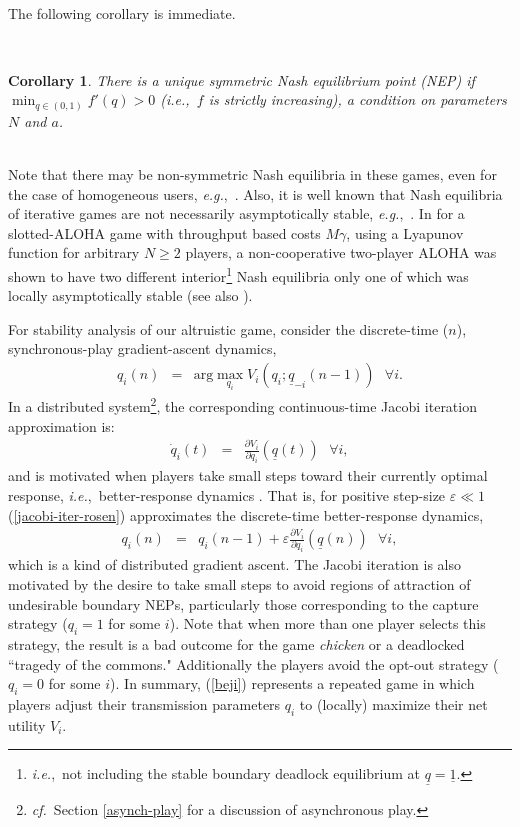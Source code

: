 \documentclass[12pt,onecolumn,draftcls]{IEEEtran}
\newtheorem{corollary}{Corollary}[section]
\newcommand{\ie}{{\em i.e.},~}
\newcommand{\eg}{{\em e.g.},~}
\newcommand{\cf}{{\em cf.}~}
\newcommand{\uq}{\underline{q}}
\newcommand{\uone}{\underline{1}}
\newcommand{\be}{\begin{eqnarray}}
\newcommand{\ee}{\end{eqnarray}}
\begin{document}
~\\
The following corollary is immediate.

~\\

\begin{corollary}
There is a unique symmetric Nash equilibrium point (NEP)
if 
$\min_{q\in(0,1)}f'(q) > 0$
(\ie $f$ is strictly increasing), a condition
on parameters $N$ and $a$.  
\end{corollary}



~\\
Note that there may be non-symmetric Nash equilibria in these games,
even for the case of homogeneous users, \eg \cite{JinKes12}.
Also, it is well known that
Nash equilibria of iterative games are not necessarily asymptotically
stable, \eg \cite{Seade80,Levine85,ZhangZhang96}.  In
\cite{Jin02a,Jin02b} for a slotted-ALOHA game with throughput based costs
$M\gamma$, using a Lyapunov function for arbitrary $N\geq 2$ players, a
non-cooperative two-player ALOHA was shown  to have two different
interior\footnote{\ie not including the stable boundary deadlock
equilibrium at $\uq=\uone$.} Nash equilibria only one of which was locally asymptotically
stable (see also \cite{Menache07}). 

For  stability analysis of our altruistic
game, consider the discrete-time ($n$), synchronous-play 
gradient-ascent dynamics,
\be\label{update-rule}
q_i(n) & = &    \mbox{arg}\max_{q_i} V_i(q_i; \uq_{-i}(n-1))
~~~\forall i.
\ee
In a distributed system\footnote{\cf Section \ref{asynch-play} for a
discussion of asynchronous play.},  the corresponding continuous-time
Jacobi iteration approximation is:
\be\label{jacobi-iter-rosen}
\dot{q}_i(t) & = & 
\frac{\partial V_i}{\partial q_i}(\uq(t)) 
~~~\forall i,
\ee
and is motivated when players take small steps toward their currently optimal
response, \ie better-response dynamics \cite{Shamma05}.
That is, for positive step-size $\varepsilon\ll 1$
(\ref{jacobi-iter-rosen}) approximates the discrete-time better-response
dynamics,
\be
q_i(n) & = & q_i(n-1)+\varepsilon 
\frac{\partial V_i}{\partial q_i}(\uq(n)) 
~~~\forall i, \label{beji}
\ee
which is a kind of distributed gradient ascent.  The Jacobi iteration is
also motivated by the desire to take small steps to avoid regions of
attraction of undesirable boundary NEPs, particularly  those corresponding
to the capture strategy ($q_i=1$ for  some $i$). Note that when more than
one player selects this strategy, the result is a bad outcome for the game
{\em chicken} or a deadlocked ``tragedy of the commons." Additionally the
players avoid the opt-out strategy ($q_i=0$ for some $i$).  In summary,
(\ref{beji}) represents a repeated  game in which players adjust their
transmission parameters $q_i$ to (locally) maximize their net utility
$V_i$. 
\end{document}
